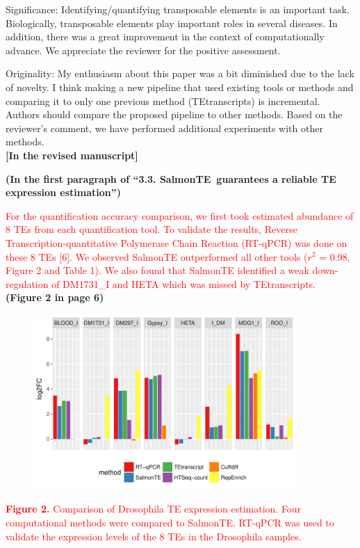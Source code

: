 \documentclass[10pt]{article}
\begin{document}
\begin{response}{Significance: Identifying/quantifying transposable elements is an important task. Biologically, transposable elements play important roles in several diseases. In addition, there was a great improvement in the context of computationally advance.}
We appreciate the reviewer for the positive assessment. 
\end{response}

\begin{response}{Originality: My enthusiasm about this paper was a bit diminished due to the lack of novelty. I think making a new pipeline that used existing tools or methods and comparing it to only one previous method (TEtranscripts) is incremental. Authors should compare the proposed pipeline to other methods.}
Based on the reviewer's comment, we have performed additional experiments with other methods.  
\\

\noindent\textbf{[In the revised manuscript]} 

\noindent\textbf{(In the first paragraph of ``3.3. SalmonTE~guarantees a reliable TE expression estimation'')}

\textcolor{red}{
For the quantification accuracy comparison, we first took estimated abundance of 8 TEs from each quantification tool. To validate the results, Reverse Transcription-quantitative Polymerase Chain Reaction (RT-qPCR) was done on these 8 TEs [6]. We observed SalmonTE outperformed all other tools ($r^2$ = 0.98, Figure 2 and Table 1). We also found that SalmonTE identified a weak down-regulation of DM1731\_I and HETA which was missed by TEtranscripts.}
\\

\noindent\textbf{(Figure 2 in page 6)}
\begin{figure}[h]
\centerline{
\includegraphics[width=10cm]{fig_bar}
}
\end{figure}
\begin{center}
\textcolor{red}{
\noindent\textbf{Figure 2.} Comparison of Drosophila TE expression estimation. Four computational methods were compared to SalmonTE. RT-qPCR was used to validate the expression levels of the 8 TEs in the Drosophila samples.}
\end{center}



\end{response}
\end{document}
